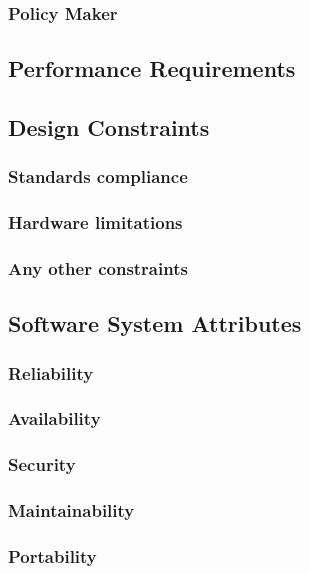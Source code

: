 \subsubsection{Policy Maker}
%






%

% 


\subsection{Performance Requirements}
\subsection{Design Constraints}
\subsubsection{Standards compliance}
\subsubsection{Hardware limitations}
\subsubsection{Any other constraints}
\subsection{Software System Attributes}
\subsubsection{Reliability}
\subsubsection{Availability}
\subsubsection{Security}
\subsubsection{Maintainability}
\subsubsection{Portability}